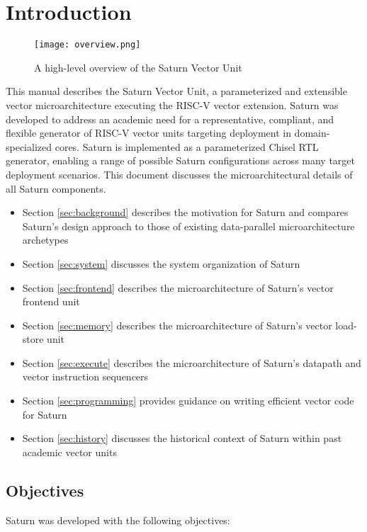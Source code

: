 \section{Introduction}


\begin{figure}[h]
  \centering
\texttt{[image: overview.png]}
\caption{A high-level overview of the Saturn Vector Unit}
\end{figure}

This manual describes the Saturn Vector Unit, a parameterized and extensible vector microarchitecture executing the RISC-V vector extension.
Saturn was developed to address an academic need for a representative, compliant, and flexible generator of RISC-V vector units targeting deployment in domain-specialized cores.
Saturn is implemented as a parameterized Chisel RTL generator, enabling a range of possible Saturn configurations across many target deployment scenarios.
This document discusses the microarchitectural details of all Saturn components.

\begin{itemize}
\item Section \ref{sec:background} describes the motivation for Saturn and compares Saturn's design approach to those of existing data-parallel microarchitecture archetypes
\item Section \ref{sec:system} discusses the system organization of Saturn
\item Section \ref{sec:frontend} describes the microarchitecture of Saturn's vector frontend unit
\item Section \ref{sec:memory} describes the microarchitecture of Saturn's vector load-store unit
\item Section \ref{sec:execute} describes the microarchitecture of Saturn's datapath and vector instruction sequencers
\item Section \ref{sec:programming} provides guidance on writing efficient vector code for Saturn
\item Section \ref{sec:history} discusses the historical context of Saturn within past academic vector units
\end{itemize}

\newpage
\subsection{Objectives}

Saturn was developed with the following objectives:

